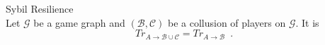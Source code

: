 \begin{theoremgr}{Sybil Resilience} \ \\
  \label{sybil}
  Let $\mathcal{G}$ be a game graph and $\left(\mathcal{B}, \mathcal{C}\right)$ be a collusion of players on
  $\mathcal{G}$. It is
  \begin{equation*}
     Tr_{A \rightarrow \mathcal{B} \cup \mathcal{C}} = Tr_{A \rightarrow \mathcal{B}} \enspace.
  \end{equation*}
\end{theoremgr}

